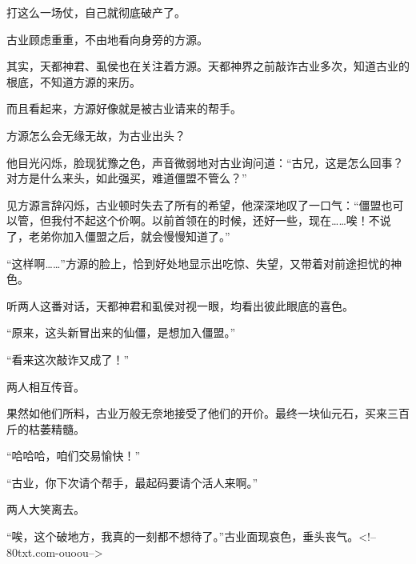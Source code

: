 \begin{this_body}
打这么一场仗，自己就彻底破产了。

古业顾虑重重，不由地看向身旁的方源。

其实，天都神君、虱侯也在关注着方源。天都神界之前敲诈古业多次，知道古业的根底，不知道方源的来历。

而且看起来，方源好像就是被古业请来的帮手。

方源怎么会无缘无故，为古业出头？

他目光闪烁，脸现犹豫之色，声音微弱地对古业询问道：“古兄，这是怎么回事？对方是什么来头，如此强买，难道僵盟不管么？”

见方源言辞闪烁，古业顿时失去了所有的希望，他深深地叹了一口气：“僵盟也可以管，但我付不起这个价啊。以前首领在的时候，还好一些，现在……唉！不说了，老弟你加入僵盟之后，就会慢慢知道了。”

“这样啊……”方源的脸上，恰到好处地显示出吃惊、失望，又带着对前途担忧的神色。

听两人这番对话，天都神君和虱侯对视一眼，均看出彼此眼底的喜色。

“原来，这头新冒出来的仙僵，是想加入僵盟。”

“看来这次敲诈又成了！”

两人相互传音。

果然如他们所料，古业万般无奈地接受了他们的开价。最终一块仙元石，买来三百斤的枯萎精髓。

“哈哈哈，咱们交易愉快！”

“古业，你下次请个帮手，最起码要请个活人来啊。”

两人大笑离去。

“唉，这个破地方，我真的一刻都不想待了。”古业面现哀色，垂头丧气。<!--80txt.com-ouoou-->

\end{this_body}

